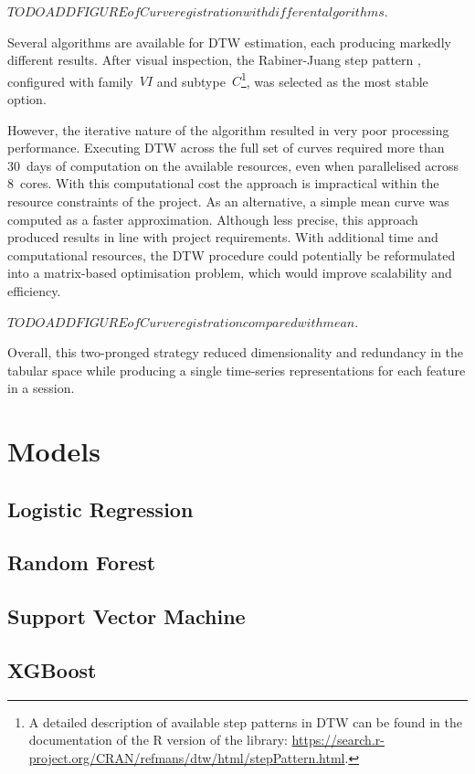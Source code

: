 $TODO ADD FIGURE of Curve registration with different algorithms.$

Several algorithms are available for DTW estimation, each producing markedly different results. After visual inspection, the Rabiner-Juang step pattern \citep{Rabiner1993}, configured with family~$VI$ and subtype~$C$\footnote{A detailed description of available step patterns in DTW can be found in the documentation of the R version of the library: \url{https://search.r-project.org/CRAN/refmans/dtw/html/stepPattern.html}.}, was selected as the most stable option.  

However, the iterative nature of the algorithm resulted in very poor processing performance. Executing DTW across the full set of curves required more than 30~days of computation on the available resources, even when parallelised across 8~cores. With this computational cost the approach is impractical within the resource constraints of the project. As an alternative, a simple mean curve was computed as a faster approximation. Although less precise, this approach produced results in line with project requirements. With additional time and computational resources, the DTW procedure could potentially be reformulated into a matrix-based optimisation problem, which would improve scalability and efficiency.


$TODO ADD FIGURE of Curve registration compared with mean.$

Overall, this two-pronged strategy reduced dimensionality and redundancy in the tabular space while producing a single time-series representations for each feature in a session.


\section{Models}\label{sec:method-models}
\subsection{Logistic Regression}\label{subsec:method-baselines}
\subsection{Random Forest}\label{subsec:method-baselines}
\subsection{Support Vector Machine}\label{subsec:method-baselines}
\subsection{XGBoost}\label{subsec:method-baselines}
